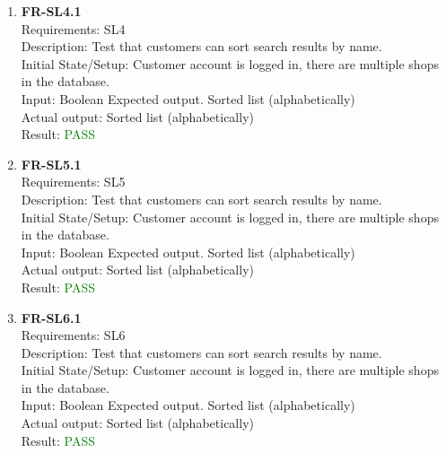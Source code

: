 \documentclass[12pt, titlepage]{article}
\newcommand{\testpass}{\textcolor{green}{PASS}}
\begin{document}
\begin{enumerate}
                    
                \item \textbf{FR-SL4.1} \label{FR-SL4.1} \\ Requirements: SL4 \\
                    Description: Test that customers can sort search results by name. \\
                    Initial State/Setup: Customer account is logged in, there are multiple shops in the database. \\
                    Input: Boolean
                    Expected output. Sorted list (alphabetically)\\
                    Actual output: Sorted list (alphabetically)\\
                    Result: \testpass
                    
                    
                \item \textbf{FR-SL5.1} \label{FR-SL5.1} \\ Requirements: SL5 \\
                    Description: Test that customers can sort search results by name. \\
                    Initial State/Setup: Customer account is logged in, there are multiple shops in the database. \\
                    Input: Boolean
                    Expected output. Sorted list (alphabetically)\\
                    Actual output: Sorted list (alphabetically)\\
                    Result: \testpass

                \item \textbf{FR-SL6.1} \label{FR-SL6.1} \\ Requirements: SL6 \\
                    Description: Test that customers can sort search results by name. \\
                    Initial State/Setup: Customer account is logged in, there are multiple shops in the database. \\
                    Input: Boolean
                    Expected output. Sorted list (alphabetically)\\
                    Actual output: Sorted list (alphabetically)\\
                    Result: \testpass


\end{enumerate}
\end{document}
